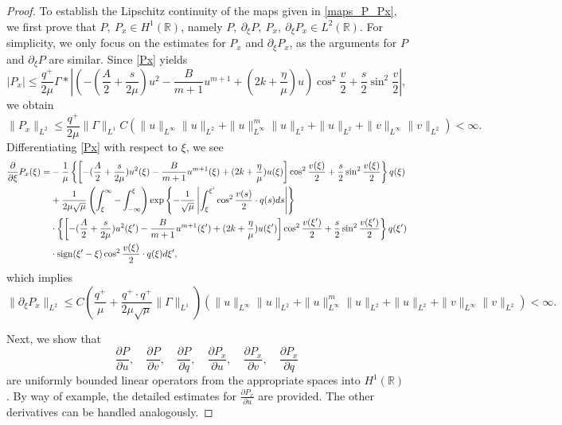\documentclass[10pt]{article}
\numberwithin{equation}{section}
\begin{document}
\begin{proof}
		To establish the Lipschitz continuity of the maps given in \eqref{maps_P_Px}, we first prove that $P,\ P_x\in H^1(\mathbb{R})$, namely $P,\ \partial_{\xi}P,\ P_x,\ \partial_{\xi}P_x\in L^2(\mathbb{R})$. For simplicity, we only focus on the estimates for $P_x$ and $\partial_{\xi}P_x$, as the arguments for $P$ and $\partial_{\xi}P$ are similar. Since \eqref{Px} yields 
		$$
		\mid P_x\mid\leq\frac{q^+}{2\mu}\Gamma*\left| \left(-(\frac{A}{2}+\frac{s}{2\mu})u^2-\frac{B}{m+1}u^{m+1}+(2k+\frac{\eta}{\mu})u\right)\cos^2\frac{v}{2}+\frac{s}{2}\sin^2\frac{v}{2}\right|,
		$$
		we obtain
		$$
		\|P_x\|_{L^2}\leq\frac{q^+}{2\mu}\|\Gamma\|_{L^1}C(\|u\|_{L^\infty}\|u\|_{L^2}+\|u\|_{L^\infty}^m\|u\|_{L^2}+\|u\|_{L^2}+\|v\|_{L^\infty}\|v\|_{L^2})<\infty.
		$$
		Differentiating \eqref{Px} with respect to $\xi$, we see
		\begin{align}
			\frac{\partial}{\partial\xi}P_{x}(\xi) =&-\frac{1}{\mu}\left\{\left[-(\frac{A}{2}+\frac{s}{2\mu})u^2(\xi)-\frac{B}{m+1}u^{m+1}(\xi)+(2k+\frac{\eta}{\mu})u(\xi)\right]\cos^2\frac{v(\xi)}{2}+\frac{s}{2}\sin^2\frac{v(\xi)}{2}\right\}q(\xi) \notag\\
			& +\frac{1}{2\mu\sqrt{\mu}}\left(\int_{\xi}^{\infty}-\int_{-\infty}^{\xi}\right)\exp\left\{-\frac{1}{\sqrt{\mu}}\left|\int_{\xi}^{\xi^{\prime}}\cos^{2}\frac{v(s)}{2}\cdot q(s)ds\right|\right\} \notag\\
			& \cdot\left\{\left[-(\frac{A}{2}+\frac{s}{2\mu})u^2(\xi^{\prime})-\frac{B}{m+1}u^{m+1}(\xi^{\prime})+(2k+\frac{\eta}{\mu})u(\xi^{\prime})\right]\cos^2\frac{v(\xi^{\prime})}{2}+\frac{s}{2}\sin^2\frac{v(\xi^{\prime})}{2}\right\}q(\xi^{\prime})\notag\\
			&
			\cdot\mathrm{sign}(\xi^{\prime}-\xi)\cos^2\frac{v(\xi)}{2}\cdot q(\xi)d\xi^{\prime},\label{partial_xi Px}
		\end{align}
		which implies
		$$
		\|\partial_{\xi} P_{x}\|_{L^2}\leq C\left(\frac{q^+}{\mu}+\frac{q^+\cdot q^+}{2\mu\sqrt{\mu}}\|\Gamma\|_{L^1}\right)(\|u\|_{L^\infty}\|u\|_{L^2}+\|u\|_{L^\infty}^m\|u\|_{L^2}+\|u\|_{L^2}+\|v\|_{L^\infty}\|v\|_{L^2})<\infty.
		$$
		
		Next, we show that
		$$\frac{\partial P}{\partial u},\quad\frac{\partial P}{\partial v},\quad\frac{\partial P}{\partial q},\quad\frac{\partial P_x}{\partial u},\quad\frac{\partial P_x}{\partial v},\quad\frac{\partial P_x}{\partial q}$$
		are uniformly bounded linear operators from the appropriate spaces into $H^1(\mathbb{R})$. By way of example, the detailed estimates for $\frac{\partial P_x}{\partial u}$ are provided. The other derivatives can be handled analogously.
		

\end{proof}
\end{document}
